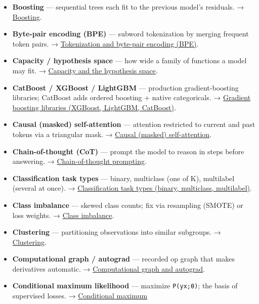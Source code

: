 \documentclass[
  10pt,
  letterpaper,
  onecolumn]{article}
\begin{document}
\begin{itemize}
\item
  \textbf{Boosting} --- sequential trees each fit to the previous
  model's residuals. → \protect\hyperlink{boosting}{Boosting}.
\item
  \textbf{Byte-pair encoding (BPE)} --- subword tokenization by merging
  frequent token pairs. →
  \protect\hyperlink{tokenization-and-byte-pair-encoding-bpe}{Tokenization
  and byte-pair encoding (BPE)}.
\item
  \textbf{Capacity / hypothesis space} --- how wide a family of
  functions a model may fit. →
  \protect\hyperlink{capacity-and-the-hypothesis-space}{Capacity and the
  hypothesis space}.
\item
  \textbf{CatBoost / XGBoost / LightGBM} --- production
  gradient-boosting libraries; CatBoost adds ordered boosting + native
  categoricals. →
  \protect\hyperlink{gradient-boosting-libraries-xgboost-lightgbm-catboost}{Gradient
  boosting libraries (XGBoost, LightGBM, CatBoost)}.
\item
  \textbf{Causal (masked) self-attention} --- attention restricted to
  current and past tokens via a triangular mask. →
  \protect\hyperlink{causal-masked-self-attention}{Causal (masked)
  self-attention}.
\item
  \textbf{Chain-of-thought (CoT)} --- prompt the model to reason in
  steps before answering. →
  \protect\hyperlink{chain-of-thought-prompting}{Chain-of-thought
  prompting}.
\item
  \textbf{Classification task types} --- binary, multiclass (one of K),
  multilabel (several at once). →
  \protect\hyperlink{classification-task-types-binary-multiclass-multilabel}{Classification
  task types (binary, multiclass, multilabel)}.
\item
  \textbf{Class imbalance} --- skewed class counts; fix via resampling
  (SMOTE) or loss weights. → \protect\hyperlink{class-imbalance}{Class
  imbalance}.
\item
  \textbf{Clustering} --- partitioning observations into similar
  subgroups. → \protect\hyperlink{clustering}{Clustering}.
\item
  \textbf{Computational graph / autograd} --- recorded op graph that
  makes derivatives automatic. →
  \protect\hyperlink{computational-graph-and-autograd}{Computational
  graph and autograd}.
\item
  \textbf{Conditional maximum likelihood} --- maximize
  \texttt{P(y\textbar x;θ)}; the basis of supervised losses. →
  \protect\hyperlink{conditional-maximum-likelihood}{Conditional maximum
}
\end{itemize}
\end{document}
